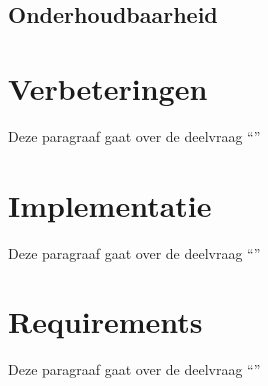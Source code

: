 \subsection{Onderhoudbaarheid}

\section{Verbeteringen}
Deze paragraaf gaat over de deelvraag \enquote{\deelverbetering}


\section{Implementatie}
Deze paragraaf gaat over de deelvraag \enquote{\deelimplementatie}


\section{Requirements}
Deze paragraaf gaat over de deelvraag \enquote{\deelrequirements}